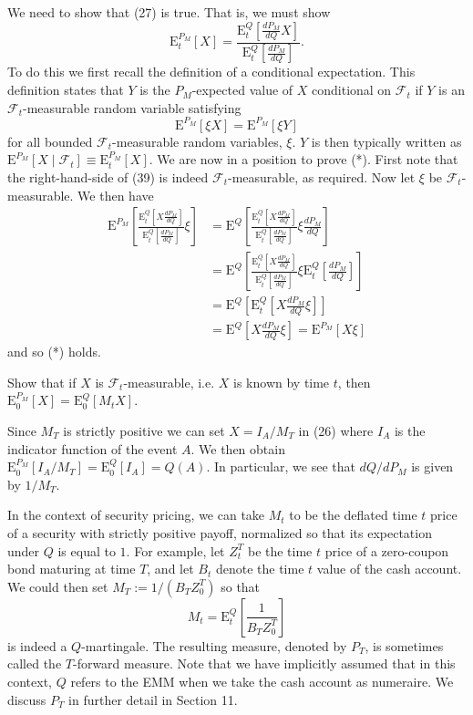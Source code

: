 We need to show that (27) is true. That is, we must show
\[\mathrm{E}_t^{P_M}[X] = \frac{\mathrm{E}_t^Q\left[\frac{dP_M}{dQ} X\right]}{\mathrm{E}_t^Q\left[\frac{dP_M}{dQ}\right]}. \tag{*}\]
To do this we first recall the definition of a conditional expectation. This definition states that $Y$ is the $P_M$-expected value of $X$ conditional on $\mathcal{F}_t$ if $Y$ is an $\mathcal{F}_t$-measurable random variable satisfying
\[\mathrm{E}^{P_M}[\xi X] = \mathrm{E}^{P_M}[\xi Y] \]
for all bounded $\mathcal{F}_t$-measurable random variables, $\xi$. $Y$ is then typically written as $\mathrm{E}^{P_M}[X\mid\mathcal{F}_t]\equiv \mathrm{E}_t^{P_M}[X]$. We are now in a position to prove (*). First note that the right-hand-side of (39) is indeed $\mathcal{F}_t$-measurable, as required. Now let $\xi$ be $\mathcal{F}_t$-measurable. We then have
\begin{align*}
\mathrm{E}^{P_M}\left[\frac{\mathrm{E}_t^Q\left[X\frac{dP_M}{dQ}\right]}{\mathrm{E}_t^Q\left[\frac{dP_M}{dQ}\right]} \xi\right] &= \mathrm{E}^Q\left[\frac{\mathrm{E}_t^Q\left[X\frac{dP_M}{dQ}\right]}{\mathrm{E}_t^Q\left[\frac{dP_M}{dQ}\right]} \xi \frac{dP_M}{dQ}\right] \\
&= \mathrm{E}^Q\left[\frac{\mathrm{E}_t^Q\left[X\frac{dP_M}{dQ}\right]}{\mathrm{E}_t^Q\left[\frac{dP_M}{dQ}\right]} \xi \mathrm{E}_t^Q\left[\frac{dP_M}{dQ}\right]\right] \\
&= \mathrm{E}^Q\left[\mathrm{E}_t^Q\left[X\frac{dP_M}{dQ} \xi\right]\right] \\
&= \mathrm{E}^Q\left[X \frac{dP_M}{dQ} \xi\right] = \mathrm{E}^{P_M}[X\xi]
\end{align*}
and so (*) holds.

\begin{example}
Show that if $X$ is $\mathcal{F}_t$-measurable, i.e. $X$ is known by time $t$, then $\mathrm{E}_0^{P_M}[X]=\mathrm{E}_0^Q[M_t X]$.
\end{example}

\begin{remark}
Since $M_T$ is strictly positive we can set $X=I_A/M_T$ in (26) where $I_A$ is the indicator function of the event $A$. We then obtain $\mathrm{E}_0^{P_M}[I_A/M_T]=\mathrm{E}_0^Q[I_A]=Q(A)$. In particular, we see that $dQ/dP_M$ is given by $1/M_T$.
\end{remark}

\begin{remark}
In the context of security pricing, we can take $M_t$ to be the deflated time $t$ price of a security with strictly positive payoff, normalized so that its expectation under $Q$ is equal to $1$. For example, let $Z_t^T$ be the time $t$ price of a zero-coupon bond maturing at time $T$, and let $B_t$ denote the time $t$ value of the cash account. We could then set $M_T:=1/(B_T Z_0^T)$ so that
\[M_t = \mathrm{E}_t^Q\left[\frac{1}{B_T Z_0^T}\right]\]
is indeed a $Q$-martingale. The resulting measure, denoted by $P_T$, is sometimes called the $T$-forward measure. Note that we have implicitly assumed that in this context, $Q$ refers to the EMM when we take the cash account as numeraire. We discuss $P_T$ in further detail in Section 11.
\end{remark}

